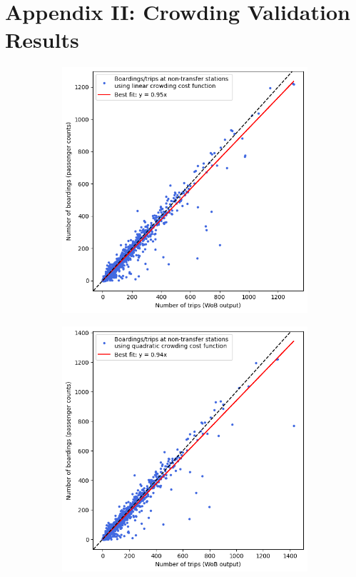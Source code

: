 \chapter{Appendix II: Crowding Validation Results}
\label{chap:crowding_results_app}

\begin{figure}[h]
    \centering
    \begin{subfigure}{0.45\linewidth}
        \centering
        \includegraphics[width=\linewidth]{images/Validation/val_lin.png}
        \label{fig:val_lin}
    \end{subfigure}
    \hfill
    \begin{subfigure}{0.45\linewidth}
        \centering
        \includegraphics[width=\linewidth]{images/Validation/val_quad.png}

\end{subfigure}
\end{figure}
